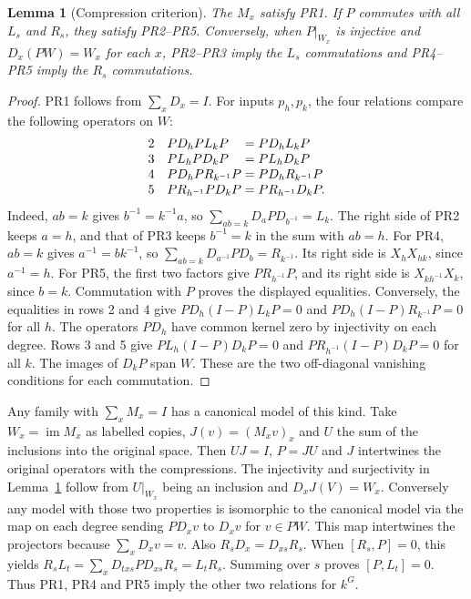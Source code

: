 \documentclass[11pt]{amsart}
\newtheorem{lemma}{Lemma}[section]
\theoremstyle{definition}
\newcommand{\im}{\operatorname{im}}
\begin{document}
\begin{lemma}[Compression criterion]\label{compression}
The $M_x$ satisfy PR1. If $P$ commutes with all $L_s$ and $R_s$, they satisfy PR2--PR5. Conversely, when $P|_{W_x}$ is injective and $D_x(PW)=W_x$ for each $x$, PR2--PR3 imply the $L_s$ commutations and PR4--PR5 imply the $R_s$ commutations.
\end{lemma}
\begin{proof}
PR1 follows from $\sum_x D_x=I$. For inputs $p_h,p_k$, the four relations compare the following operators on $W$:
\[
\begin{array}{c@{\quad}l@{\;=\;}l}
 2& PD_hPL_kP & PD_hL_kP\\
 3& PL_hPD_kP & PL_hD_kP\\
 4& PD_hPR_{k^{-1}}P & PD_hR_{k^{-1}}P\\
 5& PR_{h^{-1}}PD_kP & PR_{h^{-1}}D_kP .
\end{array}
\]
Indeed, $ab=k$ gives $b^{-1}=k^{-1}a$, so $\sum_{ab=k}D_aPD_{b^{-1}}=L_k$. The right side of PR2 keeps $a=h$, and that of PR3 keeps $b^{-1}=k$ in the sum with $ab=h$. For PR4, $ab=k$ gives $a^{-1}=bk^{-1}$, so $\sum_{ab=k}D_{a^{-1}}PD_b=R_{k^{-1}}$. Its right side is $X_hX_{hk}$, since $a^{-1}=h$. For PR5, the first two factors give $PR_{h^{-1}}P$, and its right side is $X_{kh^{-1}}X_k$, since $b=k$. Commutation with $P$ proves the displayed equalities. Conversely, the equalities in rows 2 and 4 give $PD_h(I-P)L_kP=0$ and $PD_h(I-P)R_{k^{-1}}P=0$ for all $h$. The operators $PD_h$ have common kernel zero by injectivity on each degree. Rows 3 and 5 give $PL_h(I-P)D_kP=0$ and $PR_{h^{-1}}(I-P)D_kP=0$ for all $k$. The images of $D_kP$ span $W$. These are the two off-diagonal vanishing conditions for each commutation.
\end{proof}

Any family with $\sum_xM_x=I$ has a canonical model of this kind. Take $W_x=\im M_x$ as labelled copies, $J(v)=(M_xv)_x$ and $U$ the sum of the inclusions into the original space. Then $UJ=I$, $P=JU$ and $J$ intertwines the original operators with the compressions. The injectivity and surjectivity in Lemma~\ref{compression} follow from $U|_{W_x}$ being an inclusion and $D_xJ(V)=W_x$. Conversely any model with those two properties is isomorphic to the canonical model via the map on each degree sending $PD_xv$ to $D_xv$ for $v\in PW$. This map intertwines the projectors because $\sum_xD_xv=v$. Also $R_sD_x=D_{xs}R_s$. When $[R_s,P]=0$, this yields $R_sL_t=\sum_xD_{txs}PD_{xs}R_s=L_tR_s$. Summing over $s$ proves $[P,L_t]=0$. Thus PR1, PR4 and PR5 imply the other two relations for $k^G$.
\end{document}
